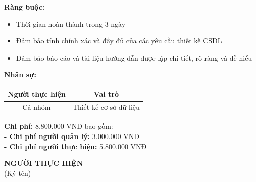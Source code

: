 {\begin{minipage}{\textwidth}
        \noindent \textbf{Ràng buộc:}
        \begin{itemize}
            \item Thời gian hoàn thành trong 3 ngày
            \item Đảm bảo tính chính xác và đầy đủ của các yêu cầu thiết kế CSDL
            \item Đảm bảo báo cáo và tài liệu hướng dẫn được lập chi tiết, rõ ràng và dễ hiểu
        \end{itemize}
        \noindent \textbf{Nhân sự:}
        \begin{longtable}{|c|c|}
        \hline
        \textbf{Người thực hiện} & \textbf{Vai trò} \\
        \hline
        Cả nhóm & Thiết kế cơ sở dữ liệu \\
        \hline
        \end{longtable}
        \noindent \textbf{Chi phí:} 8.800.000 VNĐ bao gồm:\\
        \noindent \textbf{  - Chi phí người quản lý:} 3.000.000 VNĐ\\
        \noindent \textbf{  - Chi phí người thực hiện:} 5.800.000 VNĐ
        \begin{flushleft}
            \hspace{8cm} \textbf{NGƯỜI THỰC HIỆN} \\
            \hspace{9.5cm} (Ký tên) \\
            \vspace{1cm}
        \end{flushleft}
	\end{minipage}
}    
